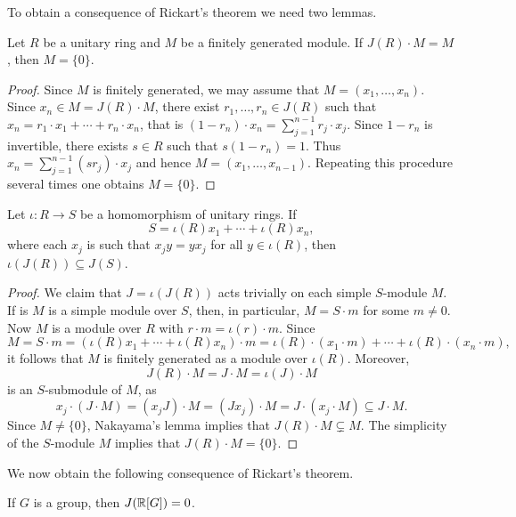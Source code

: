 To obtain a consequence of Rickart's theorem we need two lemmas. 

\begin{lemma}[Nakayama]
	\label{lem:Nakayama}
	Let $R$ be a unitary ring and $M$ be a finitely generated module. If 
	$J(R)\cdot M=M$, then $M=\{0\}$.
\end{lemma}

\begin{proof}
    Since $M$ is finitely generated, we may assume that 
	$M=(x_1,\dots,x_n)$. Since $x_n\in M=J(R)\cdot M$, 
	there exist $r_1,\dots,r_n\in J(R)$ such that $x_n=r_1\cdot x_1+\cdots+r_n\cdot x_n$, that is 
	$(1-r_n)\cdot x_n=\sum_{j=1}^{n-1}r_j\cdot x_j$. 
	Since $1-r_n$ is invertible, there exists $s\in R$ such that $s(1-r_n)=1$. Thus 
	$x_n=\sum_{j=1}^{n-1}(sr_j)\cdot x_j$ 
	and hence $M=(x_1,\dots,x_{n-1})$. Repeating this procedure several times 
	one obtains $M=\{0\}$.
\end{proof}

\begin{lemma}
	\label{lem:Rickart}
	Let $\iota\colon R\to S$ be a homomorphism of unitary rings. If	
	\[
	S=\iota(R)x_1+\cdots+\iota(R)x_n,
	\]
	where each $x_j$ is such that $x_jy=yx_j$ for all $y\in\iota(R)$, then 
	$\iota(J(R))\subseteq J(S)$.
\end{lemma}

\begin{proof}
	We claim that $J=\iota(J(R))$ acts trivially on each simple $S$-module $M$.
	If is $M$ is a simple module over $S$, then, in particular, $M=S\cdot m$ for some $m\ne0$. 
	Now $M$ is a module over $R$ with $r\cdot m=\iota(r)\cdot m$. Since 
	\[
		M=S\cdot m=(\iota(R)x_1+\cdots+\iota(R)x_n)\cdot m=\iota(R)\cdot (x_1\cdot m)+\cdots+\iota(R)\cdot (x_n\cdot m),
	\]
	it follows that 
	$M$ is finitely generated as a module over $\iota(R)$. Moreover, 
	\[
	J(R)\cdot
	M=J\cdot M=\iota(J)\cdot M
	\]
	is an $S$-submodule of $M$, as 
	\[
		x_j\cdot (J\cdot M)=(x_j J)\cdot M=(J x_j)\cdot M=J\cdot (x_j\cdot M)\subseteq J\cdot M.
	\]
	Since $M\ne\{0\}$, Nakayama's lemma implies that $J(R)\cdot M\subsetneq M$. The simplicity of 
	the $S$-module $M$ implies that $J(R)\cdot M=\{0\}$.
\end{proof}

We now obtain the following consequence of Rickart's theorem. 

\begin{theorem}
	If $G$ is a group, then $J(\mathbb{R}[G])=0$. 
\end{theorem}

